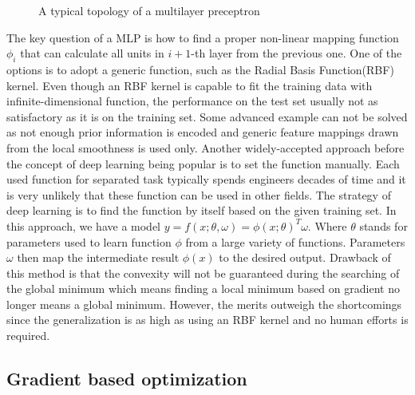 \begin{figure}[!ht]
    \centering
    \caption{A typical topology of a multilayer preceptron}
    \label{lr_fig:ml_mlp_intro}
\end{figure}
%
The key question of a MLP is how to find a proper non-linear mapping function $\phi_i$ that can calculate all units in $i+1$-th layer from the previous one.
One of the options is to adopt a generic function, such as the Radial Basis Function(RBF)\cite{chang2010} kernel.
Even though an RBF kernel is capable to fit the training data with infinite-dimensional function, the performance on the test set usually not as satisfactory as it is on the training set.
Some advanced example can not be solved as not enough prior information is encoded and generic feature mappings drawn from the local smoothness is used only.
Another widely-accepted approach before the concept of deep learning being popular is to set the function manually.
Each used function for separated task typically spends engineers decades of time and it is very unlikely that these function can be used in other fields.
The strategy of deep learning is to find the function by itself based on the given training set.
In this approach, we have a model $y=f(x;\theta,\omega)=\phi(x;\theta)^T\omega$.
Where $\theta$ stands for parameters used to learn function $\phi$ from a large variety of functions.
Parameters $\omega$ then map the intermediate result $\phi(x)$ to the desired output.
Drawback of this method is that the convexity will not be guaranteed during the searching of the global minimum which means finding a local minimum based on gradient no longer means a global minimum.
However, the merits outweigh the shortcomings since the generalization is as high as using an RBF kernel and no human efforts is required.

\subsection{Gradient based optimization}
